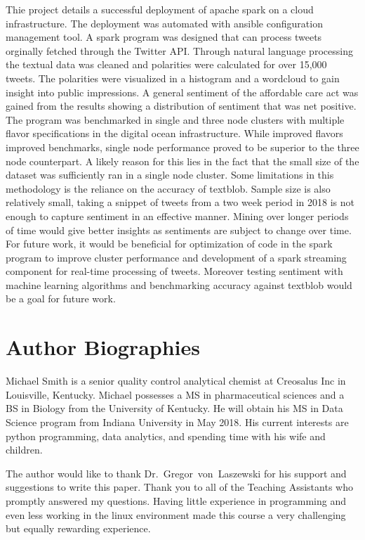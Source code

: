 Thie project details a successful deployment of apache spark on a
cloud infrastructure.  The deployment was automated with ansible
configuration management tool.  A spark program was designed that can
process tweets orginally fetched through the Twitter API.  Through
natural language processing the textual data was cleaned and
polarities were calculated for over 15,000 tweets.  The polarities
were visualized in a histogram and a wordcloud to gain insight into
public impressions.  A general sentiment of the affordable care act
was gained from the results showing a distribution of sentiment that
was net positive.  The program was benchmarked in single and three
node clusters with multiple flavor specifications in the digital ocean
infrastructure.  While improved flavors improved benchmarks, single
node performance proved to be superior to the three node counterpart.
A likely reason for this lies in the fact that the small size of the
dataset was sufficiently ran in a single node cluster.  Some
limitations in this methodology is the reliance on the accuracy of
textblob.  Sample size is also relatively small, taking a snippet of
tweets from a two week period in 2018 is not enough to capture
sentiment in an effective manner.  Mining over longer periods of time
would give better insights as sentiments are subject to change over
time.  For future work, it would be beneficial for optimization of
code in the spark program to improve cluster performance and
development of a spark streaming component for real-time processing of
tweets.  Moreover testing sentiment with machine learning
algorithms and benchmarking accuracy against textblob would be a goal for
future work.

\section{Author Biographies}

Michael Smith is a senior quality control analytical chemist at
Creosalus Inc in Louisville, Kentucky.  Michael possesses a MS in
pharmaceutical sciences and a BS in Biology from the University of
Kentucky.  He will obtain his MS in Data Science program from Indiana
University in May 2018.  His current interests are python programming,
data analytics, and spending time with his wife and children.

\begin{acks}

  The author would like to thank Dr.~Gregor~von~Laszewski for his
  support and suggestions to write this paper.  Thank you to all of
  the Teaching Assistants who promptly answered my questions.  Having
  little experience in programming and even less working in the linux
  environment made this course a very challenging but equally
  rewarding experience.

\end{acks}


 

